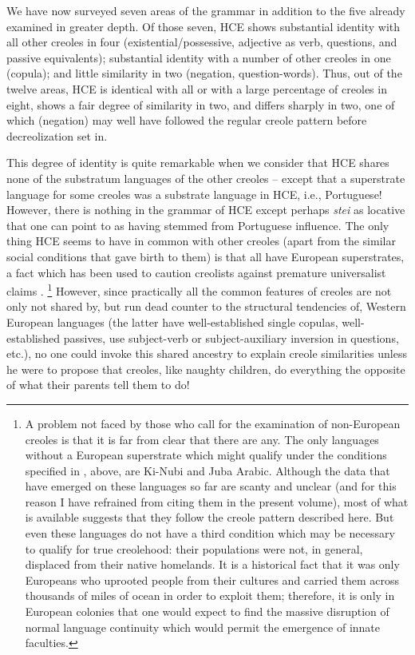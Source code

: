 We have now surveyed seven areas of the grammar in addition to the five already examined in greater depth. Of those seven, HCE shows substantial identity with all other creoles in four (existential/possessive, adjective as verb, questions, and passive equivalents); substantial iden\-tity with a number of other creoles in one (copula); and little simi\-larity in two (negation, question-words). Thus, out of the twelve areas, HCE is identical with all or with a large percentage of creoles in eight, shows a fair degree of similarity in two, and differs sharply in two, one of which (negation) may well have followed the regular creole pattern before decreolization set in.

This degree of identity is quite remarkable when we consider that HCE shares none of the substratum languages of the other creoles -- %
except that a superstrate language for some creoles was a substrate language in HCE, i.e., Portuguese! However, there is nothing in the grammar of HCE except perhaps \textit{stei} as locative that one can point to as having stemmed from Portuguese influence. The only thing HCE seems to have in common with other creoles (apart from the simi\-lar social conditions that gave birth to them) is that all have European superstrates, a fact which has been used to caution creolists against premature universalist claims \citep{Reinecke1977}.%
\footnote{A problem not faced by those who call for the examination of non-European creoles is that it is far from clear that there are any. The only languages without a European superstrate which might qualify under the conditions specified in , above, are Ki-Nubi and Juba Arabic. Although the data that have emerged on these lan\-guages so far are scanty and unclear (and for this reason I have refrained from citing them in the present volume), most of what is available suggests that they follow the creole pattern described here. But even these languages do not have a third condition which may be necessary to qualify for true creolehood: their populations were not, in general, displaced from their native homelands. It is a historical fact that it was only Europeans who uprooted people from their cultures and carried them across thousands of miles of ocean in order to exploit them; therefore, it is only in European colonies that one would expect to find the massive disruption of normal language continuity which would permit the emergence of innate faculties.} 
However, since practi\-cally all the common features of creoles are not only not shared by, but run dead counter to the structural tendencies of, Western Euro\-pean languages (the latter have well-established single copulas, well-established passives, use subject-verb or subject-auxiliary inversion in questions, etc.), no one could invoke this shared ancestry to explain creole similarities unless he were to propose that creoles, like naughty children, do everything the opposite of what their parents tell them to do!

